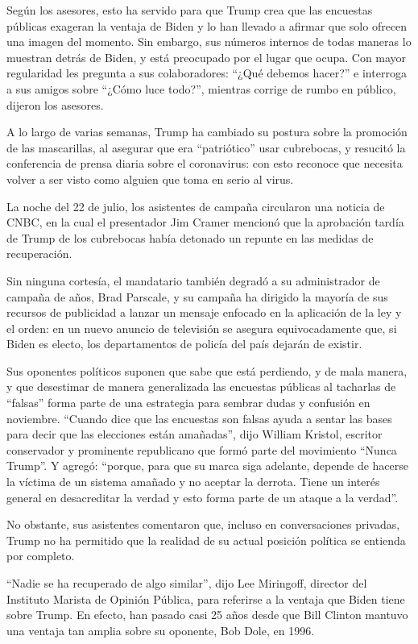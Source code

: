 Según los asesores, esto ha servido para que Trump crea que las
encuestas públicas exageran la ventaja de Biden y lo han llevado a
afirmar que solo ofrecen una imagen del momento. Sin embargo, sus
números internos de todas maneras lo muestran detrás de Biden, y está
preocupado por el lugar que ocupa. Con mayor regularidad les pregunta a
sus colaboradores: ``¿Qué debemos hacer?'' e interroga a sus amigos
sobre ``¿Cómo luce todo?'', mientras corrige de rumbo en público,
dijeron los asesores.

A lo largo de varias semanas, Trump ha cambiado su postura sobre la
promoción de las mascarillas, al asegurar que era ``patriótico'' usar
cubrebocas, y resucitó la conferencia de prensa diaria sobre el
coronavirus: con esto reconoce que necesita volver a ser visto como
alguien que toma en serio al virus.

La noche del 22 de julio, los asistentes de campaña circularon una
noticia de CNBC, en la cual el presentador Jim Cramer mencionó que la
aprobación tardía de Trump de los cubrebocas había detonado un repunte
en las medidas de recuperación.

Sin ninguna cortesía, el mandatario también degradó a su administrador
de campaña de años, Brad Parscale, y su campaña ha dirigido la mayoría
de sus recursos de publicidad a lanzar un mensaje enfocado en la
aplicación de la ley y el orden: en un nuevo anuncio de televisión se
asegura equivocadamente que, si Biden es electo, los departamentos de
policía del país dejarán de existir.

Sus oponentes políticos suponen que sabe que está perdiendo, y de mala
manera, y que desestimar de manera generalizada las encuestas públicas
al tacharlas de ``falsas'' forma parte de una estrategia para sembrar
dudas y confusión en noviembre. ``Cuando dice que las encuestas son
falsas ayuda a sentar las bases para decir que las elecciones están
amañadas'', dijo William Kristol, escritor conservador y prominente
republicano que formó parte del movimiento ``Nunca Trump''. Y agregó:
``porque, para que su marca siga adelante, depende de hacerse la víctima
de un sistema amañado y no aceptar la derrota. Tiene un interés general
en desacreditar la verdad y esto forma parte de un ataque a la verdad''.

No obstante, sus asistentes comentaron que, incluso en conversaciones
privadas, Trump no ha permitido que la realidad de su actual posición
política se entienda por completo.

``Nadie se ha recuperado de algo similar'', dijo Lee Miringoff, director
del Instituto Marista de Opinión Pública, para referirse a la ventaja
que Biden tiene sobre Trump. En efecto, han pasado casi 25 años desde
que Bill Clinton mantuvo una ventaja tan amplia sobre su oponente, Bob
Dole, en 1996.


